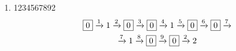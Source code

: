 \documentclass[12pt]{article}
\begin{document}
\begin {enumerate}
\item 1234567892
\begin {equation*} 
\begin {gathered} 
\fbox{0} \xrightarrow{1} 1 \xrightarrow{2} \fbox{0} \xrightarrow{3} \fbox{0} \xrightarrow{4} 1 \xrightarrow{5} \fbox{0} \xrightarrow{6} \fbox{0} \xrightarrow{7} \\
 \xrightarrow{7} 1 \xrightarrow{8} \fbox{0} \xrightarrow{9} \fbox{0} \xrightarrow{2} 2
\end {gathered} 
\end {equation*} 

\end {enumerate}
\end{document}
